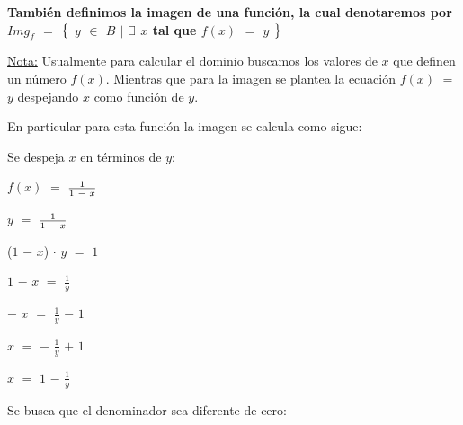 \documentclass[12pt]{article}
\newenvironment{MyColorPar}[1]{%
    \leavevmode\color{#1}\ignorespaces%
}{%
}%
\begin{document}
\begin{MyColorPar}{Lochinvar} \bfseries{
{} También definimos la imagen de una función, la cual denotaremos por $Img_{f}$ $=$ $\big{\{}$ $y$ $\in$ $B$ $\mid$ $\exists$ $x$ tal que $f(x)$ $=$ $y$} $\big{\}}$ \vspace{0.5cm}

{\underline{Nota:}} Usualmente para calcular el dominio buscamos los valores de $x$ que definen un número $f(x)$. Mientras que para la imagen se plantea la ecuación $f(x)$ $=$ $y$ despejando $x$ como función de $y$. \vspace{0.5cm}

En particular para esta función la imagen se calcula como sigue: \vspace{0.5cm}

Se despeja $x$ en términos de $y$: \vspace{0.5cm}

\hspace{4cm}  $f(x)$ $=$ {\LARGE{$\frac{1}{1 \hspace{0.1cm} - \hspace{0.1cm} x }$}} \vspace{0.5cm}

\hspace{4cm}  $y$ $=$ {\LARGE{$\frac{1}{1 \hspace{0.1cm} - \hspace{0.1cm} x }$}} \vspace{0.5cm}

\hspace{1.8cm}  ($1$ $-$ $x$) $\cdot$ $y$ $=$ $1$ \vspace{0.5cm}

\hspace{3cm}  $1$ $-$ $x$ $=$ {\LARGE{$\frac{1}{y}$}}  \vspace{0.5cm}

\hspace{3.5cm}   $-$ $x$ $=$ {\LARGE{$\frac{1}{y}$}} $-$ $1$ \vspace{0.5cm}

\hspace{4.1cm}   $x$ $=$ $-$ {\LARGE{$\frac{1}{y}$}} $+$ $1$ \vspace{0.5cm}

\hspace{4.1cm}   $x$ $=$ $1$ $-$ {\LARGE{$\frac{1}{y}$}}  \vspace{0.5cm}

Se busca que el denominador sea diferente de cero:\vspace{0.5cm}


\end{MyColorPar}
\end{document}
